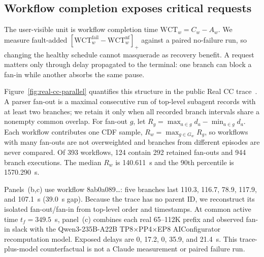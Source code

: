 \subsection{Workflow completion exposes critical requests}

The user-visible unit is workflow completion time
$\mathrm{WCT}_w=C_w-A_w$.  We measure fault-added
$[\mathrm{WCT}^{\mathrm{fail}}_w-\mathrm{WCT}^{\mathrm{nf}}_w]_+$ against a
paired no-failure run, so changing the healthy schedule cannot masquerade as
recovery benefit.  A request matters only through delay propagated to the
terminal: one branch can block a fan-in while another absorbs the same pause.

Figure~\ref{fig:real-cc-parallel} quantifies this structure in the public Real
CC trace~\cite{semianalysis2026cctraces}.  A parser fan-out is a maximal
consecutive run of top-level subagent records with at least two branches; we
retain it only when all recorded branch intervals share a nonempty common
overlap.  For fan-out $g$, let
$R_g=\max_{a\in g}d_a-\min_{a\in g}d_a$.  Each workflow contributes one CDF
sample, $R_w=\max_{g\in G_w}R_g$, so workflows with many fan-outs are not
overweighted and branches from different episodes are never compared.  Of 393
workflows, 124 contain 292 retained fan-outs and 944 branch executions.  The
median $R_w$ is 140.611~s and the 90th percentile is 1570.290~s.

Panels~(b,c) use workflow 8ab0a089\ldots: five branches last 110.3, 116.7,
78.9, 117.9, and 107.1~s (39.0~s gap).  Because the trace has no parent ID, we
reconstruct its isolated fan-out/fan-in from top-level order and timestamps.
At common active time $t_f=349.5$~s, panel~(c) combines each real 65--112K
prefix and observed fan-in slack with the Qwen3-235B-A22B
TP8$\times$PP4$\times$EP8 AIConfigurator recomputation model.  Exposed delays
are 0, 17.2, 0, 35.9, and 21.4~s.  This trace-plus-model counterfactual is not a
Claude measurement or paired failure run.

